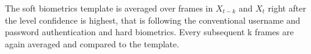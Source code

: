 \documentclass[12pt]{article}			%
\begin{document}
\begin{figure}
	\centering
	\quad
\end{figure}
The soft biometrics template is averaged over frames in $X_{t-k}$ and $X_{t}$ right after the level confidence is highest, that is following the conventional username and password authentication and hard biometrics. Every subsequent k frames are again averaged and compared to the template. 
\end{document}
